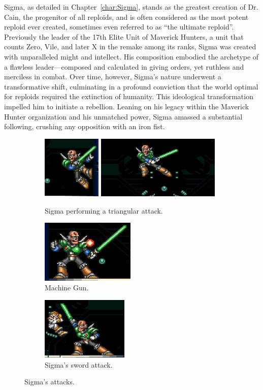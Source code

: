 Sigma, as detailed in Chapter~\ref{char:Sigma}, stands as the greatest creation of Dr. Cain, the progenitor of all reploids, and is often considered as the most potent reploid ever created, sometimes even referred to as ``the ultimate reploid''. Previously the leader of the 17th Elite Unit of Maverick Hunters, a unit that counts Zero, Vile, and later X in the remake among its ranks, Sigma was created with unparalleled might and intellect. His composition embodied the archetype of a flawless leader—composed and calculated in giving orders, yet ruthless and merciless in combat. Over time, however, Sigma's nature underwent a transformative shift, culminating in a profound conviction that the world optimal for reploids required the extinction of humanity. This ideological transformation impelled him to initiate a rebellion. Leaning on his legacy within the Maverick Hunter organization and his unmatched power, Sigma amassed a substantial following, crushing any opposition with an iron fist.
\begin{figure}[htp]
	\centering
	\begin{subfigure}{\linewidth}
		\centering
		\includegraphics[height=3cm]{figures/X1/Sigma_stages/Sigma_leap_3.jpg}
		\includegraphics[height=3cm]{figures/X1/Sigma_stages/Sigma_leap.jpg}
		\caption{Sigma performing a triangular attack.}
	\end{subfigure}
	\begin{subfigure}{0.4\linewidth}
		\centering
		\includegraphics[height=3cm]{figures/X1/Sigma_stages/Sigma_plasma.jpg}
		\caption{Machine Gun.}
	\end{subfigure}
	\begin{subfigure}{0.4\linewidth}
		\centering
		\includegraphics[height=3cm]{figures/X1/Sigma_stages/Sigma_sword.jpg}
		\caption{Sigma's sword attack.}
	\end{subfigure}
	\caption{Sigma's attacks.}
\end{figure}
